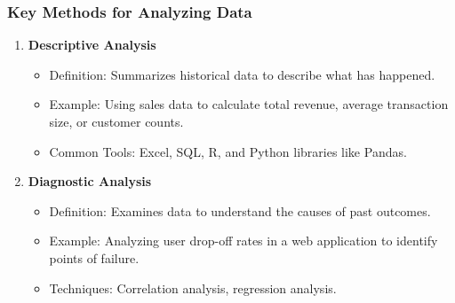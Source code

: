 \documentclass[aspectratio=169]{beamer}
\begin{document}
\begin{frame}
    \frametitle{Key Methods for Analyzing Data}
    \begin{enumerate}
        \item \textbf{Descriptive Analysis}
            \begin{itemize}
                \item Definition: Summarizes historical data to describe what has happened.
                \item Example: Using sales data to calculate total revenue, average transaction size, or customer counts.
                \item Common Tools: Excel, SQL, R, and Python libraries like Pandas.
            \end{itemize}
        \item \textbf{Diagnostic Analysis}
            \begin{itemize}
                \item Definition: Examines data to understand the causes of past outcomes.
                \item Example: Analyzing user drop-off rates in a web application to identify points of failure.
                \item Techniques: Correlation analysis, regression analysis.
            \end{itemize}
    \end{enumerate}
\end{frame}
\end{document}
